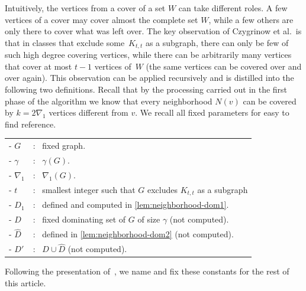 Intuitively, the vertices from a cover of a set $W$ can
take different roles. A few vertices of a cover may cover almost the
complete set $W$, while a few others are only there to cover what was
left over. The key observation of Czygrinow et al.\ is that in classes that
exclude some~$K_{t,t}$ as a subgraph, there can only be few of such
high degree covering vertices, while there can be arbitrarily many vertices
that cover at most $t-1$ vertices of~$W$ (the same vertices can be covered
over and over again). This observation can be applied recursively and is
distilled into the following two definitions. Recall that by the processing
carried out in the first phase of the algorithm
we know that every neighborhood $N(v)$ can be covered by $k=2\nabla_1$ vertices different from $v$.
We recall all fixed parameters for easy to find reference.

\bigskip
\begin{tcolorbox}
\begin{tabular}{l l}
- $G$ & :~ fixed graph. \\
- $\gamma$ & :~ $\gamma(G)$.\\
- $\nabla_1$ & :~ $\nabla_1(G)$. \\
- $t$ & :~ smallest integer such that $G$
excludes $K_{t,t}$ as a subgraph\\
- $D_1$ & :~ defined and computed in \cref{lem:neighborhood-dom1}.\\
- $D$ & :~ fixed dominating set of $G$ of size $\gamma$ (not computed).\\
- $\hat{D}$ & :~ defined in \cref{lem:neighborhood-dom2} (not computed).\\
- $D'$ & :~ $D \cup \hat{D}$ (not computed).
\end{tabular}
\end{tcolorbox}


Following the presentation of~\cite{czygrinow2018distributed}, we name and fix
these constants for the rest of this article.

